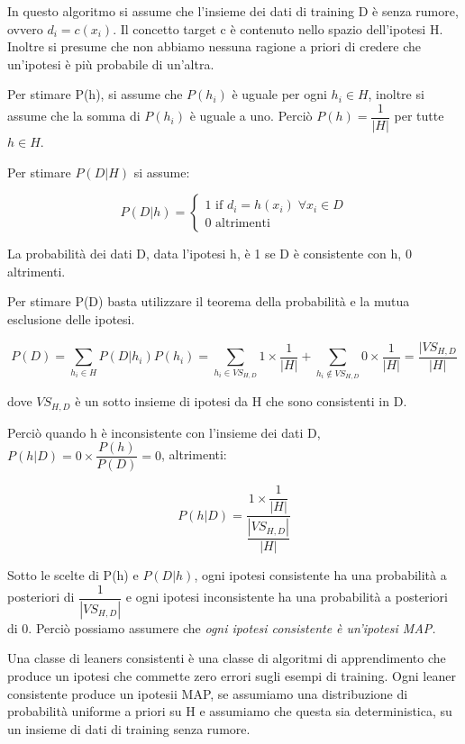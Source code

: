 \documentclass[a4paper]{extarticle}
\begin{document}
In questo algoritmo si assume che l'insieme dei dati di training D è senza rumore, ovvero $d_i = c(x_i)$. Il concetto target c è contenuto nello spazio dell'ipotesi H. Inoltre si presume che non abbiamo nessuna ragione a priori di credere che un'ipotesi è più probabile di un'altra.

Per stimare P(h), si assume che $P(h_i)$ è uguale per ogni $h_i \in H$, inoltre si assume che la somma di $P(h_i)$ è uguale a uno. Perciò $P(h) = \dfrac{1}{|H|}$ per tutte $h\in H$.

Per stimare $P(D|H)$ si assume:

\begin{equation*}
	P(D|h) = 
	\begin{cases}
		1 \text{ if }  d_i = h(x_i) \; \forall x_i \in D \\
		0 \text{ altrimenti}
	\end{cases}
\end{equation*}

La probabilità dei dati D, data l'ipotesi h, è 1 se D è consistente con h, 0 altrimenti.

Per stimare P(D) basta utilizzare il teorema della probabilità e la mutua esclusione delle ipotesi.

\begin{equation*}
P(D) = \sum\limits_{h_i \in H} P(D|h_i)P(h_i) = \sum\limits_{h_i \in VS_{H,D}} 1 \times \dfrac{1}{|H|}+ \sum \limits_{h_i \not \in VS_{H,D}} 0\times \dfrac{1}{|H|} = \dfrac{|VS_{H,D}}{|H|}
\end{equation*}

dove $VS_{H,D}$ è un sotto insieme di ipotesi da H che sono consistenti in D.

Perciò quando h è inconsistente con l'insieme dei dati D, $P(h|D) = 0 \times \dfrac{P(h)}{P(D)} = 0$, altrimenti:

\begin{equation*}
P(h|D) = \dfrac{1 \times \dfrac{1}{|H|}}{\dfrac{|VS_{H,D}|}{|H|}}
\end{equation*}

Sotto le scelte di P(h) e $P(D|h)$, ogni ipotesi consistente ha una probabilità a posteriori di $\dfrac{1}{|VS_{H,D}|}$ e ogni ipotesi inconsistente ha una probabilità a posteriori di 0. Perciò possiamo assumere che \textit{ogni ipotesi consistente è un'ipotesi MAP.}

Una classe di leaners consistenti è una classe di algoritmi di apprendimento che produce un ipotesi che commette zero errori sugli esempi di training. Ogni leaner consistente produce un ipotesii MAP, se assumiamo una distribuzione di probabilità uniforme a priori su H e assumiamo che questa sia deterministica, su un insieme di dati di training senza rumore.
\end{document}
